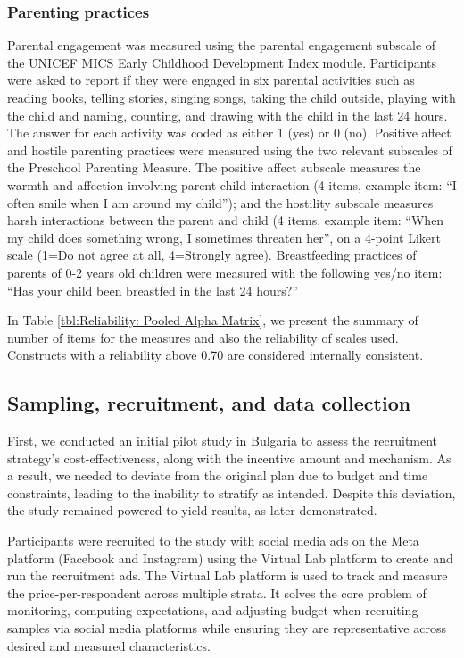 \documentclass{article}
\begin{document}
\subsubsection*{Parenting practices}

Parental engagement was measured using the parental engagement subscale of the UNICEF MICS Early Childhood Development Index module. Participants were asked to report if they were engaged in six parental activities such as reading books, telling stories, singing songs, taking the child outside, playing with the child and naming, counting, and drawing with the child in the last 24 hours. The answer for each activity was coded as either 1 (yes) or 0 (no).
Positive affect and hostile parenting practices were measured using the two relevant subscales of the Preschool Parenting Measure. The positive affect subscale measures the warmth and affection involving parent-child interaction (4 items, example item: “I often smile when I am around my child”); and the hostility subscale measures harsh interactions between the parent and child (4 items, example item: “When my child does something wrong, I sometimes threaten her”, on a 4-point Likert scale (1=Do not agree at all, 4=Strongly agree).
Breastfeeding practices of parents of 0-2 years old children were measured with the following yes/no item: “Has your child been breastfed in the last 24 hours?”

In Table \ref{tbl:Reliability: Pooled Alpha Matrix}, we present the summary of number of items for the measures and also the reliability of scales used. Constructs with a reliability above 0.70 are considered internally consistent.



\subsection{Sampling, recruitment, and data collection}

First, we conducted an initial pilot study in Bulgaria to assess the recruitment strategy's cost-effectiveness, along with the incentive amount and mechanism. As a result, we needed to deviate from the original plan due to budget and time constraints, leading to the inability to stratify as intended. Despite this deviation, the study remained powered to yield results, as later demonstrated.

Participants were recruited to the study with social media ads on the Meta platform (Facebook and Instagram) using the Virtual Lab platform to create and run the recruitment ads. The Virtual Lab platform is used to track and measure the price-per-respondent across multiple strata. It solves the core problem of monitoring, computing expectations, and adjusting budget when recruiting samples via social media platforms while ensuring they are representative across desired and measured characteristics.
\end{document}
